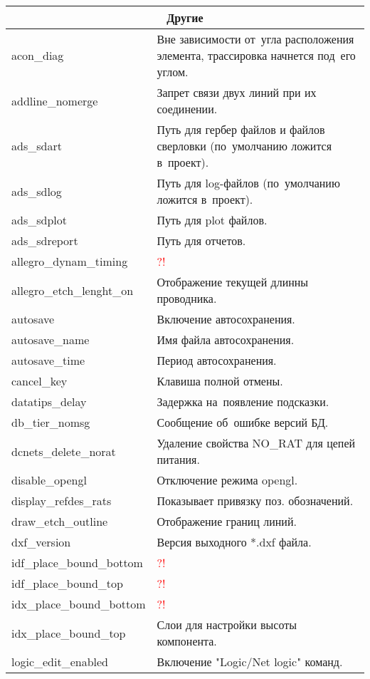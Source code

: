 \begin{tabularx}{\linewidth}{| m{6.5cm} | X |}
	\multicolumn{2}{|c|}{\textbf{Другие}}									\\ \hline
	acon\_diag 				& Вне зависимости от~угла расположения элемента, трассировка начнется под~его углом. \\ \hline
	addline\_nomerge 		& Запрет связи двух линий при их соединении.	\\ \hline
	ads\_sdart 				& Путь для гербер файлов и файлов сверловки (по~умолчанию ложится в~проект). \\ \hline
	ads\_sdlog 				& Путь для log-файлов (по~умолчанию ложится в~проект). \\ \hline
	ads\_sdplot 			& Путь для plot файлов.					\\ \hline
	ads\_sdreport 			& Путь для отчетов.						\\ \hline
	allegro\_dynam\_timing	& \textcolor{red}{?!} 					\\ \hline
	allegro\_etch\_lenght\_on& Отображение текущей длинны проводника.\\ \hline
	autosave 				& Включение автосохранения.				\\ \hline
	autosave\_name			& Имя файла автосохранения.				\\ \hline
	autosave\_time			& Период автосохранения.				\\ \hline
	cancel\_key				& Клавиша полной отмены.				\\ \hline
	datatips\_delay 		& Задержка на~появление подсказки.		\\ \hline
	db\_tier\_nomsg 		& Сообщение об~ошибке версий БД.		\\ \hline
	dcnets\_delete\_norat	& Удаление свойства NO\_RAT для цепей питания.	\\ \hline
	disable\_opengl			& Отключение режима opengl.				\\ \hline
	display\_refdes\_rats	& Показывает привязку поз. обозначений.	\\ \hline
	draw\_etch\_outline		& Отображение границ линий.				\\ \hline
	dxf\_version			& Версия выходного *.dxf файла.			\\ \hline
	idf\_place\_bound\_bottom & \textcolor{red}{?!} 					\\ \hline
	idf\_place\_bound\_top	& \textcolor{red}{?!} 					\\ \hline
	idx\_place\_bound\_bottom & \textcolor{red}{?!} 				\\ \hline
	idx\_place\_bound\_top	& Слои для настройки высоты компонента.	\\ \hline
	logic\_edit\_enabled 	& Включение "Logic/Net logic" команд.	\\ \hline 

\end{tabularx}
